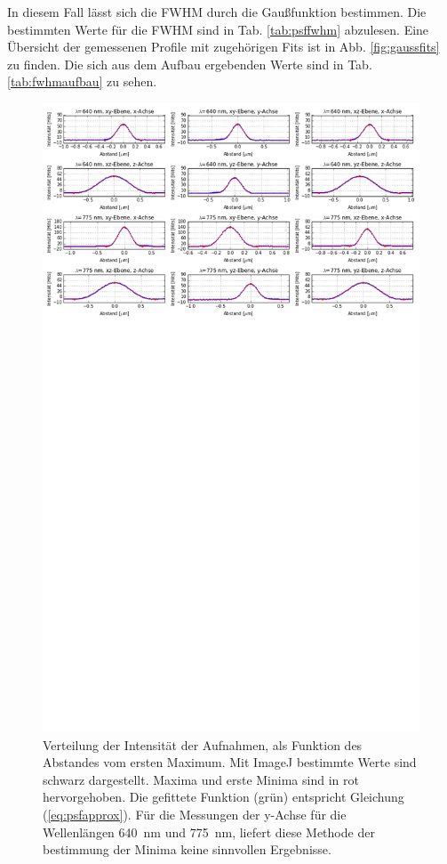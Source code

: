 In diesem Fall lässt sich die FWHM durch die Gaußfunktion bestimmen.
Die bestimmten Werte für die FWHM sind in Tab. \ref{tab:psffwhm} abzulesen. Eine Übersicht der gemessenen Profile mit zugehörigen Fits ist in Abb. \ref{fig:gaussfits} zu finden.
Die sich aus dem Aufbau ergebenden Werte sind in Tab. \ref{tab:fwhmaufbau} zu sehen.
\begin{figure}
	\centering
	\includegraphics[trim= 0 950 0 0, width=\textwidth]{plots/goldbeads.png}
	\caption{Verteilung der Intensität der Aufnahmen, als Funktion des Abstandes vom ersten Maximum. Mit ImageJ bestimmte Werte sind schwarz dargestellt. 
		Maxima und erste Minima sind in rot hervorgehoben. 
		Die gefittete Funktion (grün) entspricht Gleichung (\ref{eq:psfapprox}). 
		Für die Messungen der y-Achse für die Wellenlängen 640~nm und 775~nm, liefert diese Methode der bestimmung der Minima keine sinnvollen Ergebnisse.
	}\label{fig:psffits}
\end{figure}

